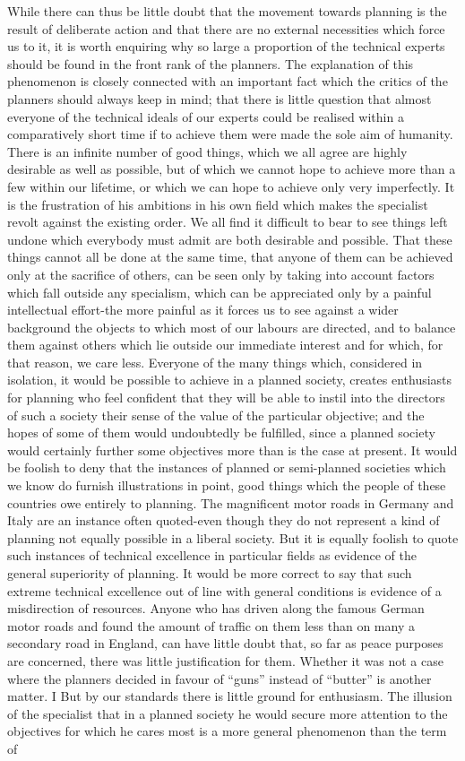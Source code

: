 \documentclass[11pt,openany]{book}
\begin{document}
While there can thus be little doubt that the movement towards planning is the result of deliberate action and that there are no external necessities which force us to it, it is worth enquiring why so large a proportion of the technical experts should be found in the front rank of the planners. The explanation of this phenomenon is closely connected with an important fact which the critics of the planners should always keep in mind; that there is little question that almost everyone of the technical ideals of our experts could be realised within a comparatively short time if to achieve them were made the sole aim of humanity. There is an infinite number of good things, which we all agree are highly desirable as well as possible, but of which we cannot hope to achieve more than a few within our lifetime, or which we can hope to achieve only very imperfectly. It is the frustration of his ambitions in his own field which makes the specialist revolt against the existing order. We all find it difficult to bear to see things left undone which everybody must admit are both desirable and possible. That these things cannot all be done at the same time, that anyone of them can be achieved only at the sacrifice of others, can be seen only by taking into account factors which fall outside any specialism, which can be appreciated only by a painful intellectual effort-the more painful as it forces us to see against a wider background the objects to which most of our labours are directed, and to balance them against others which lie outside our immediate interest and for which, for that reason, we care less. Everyone of the many things which, considered in isolation, it would be possible to achieve in a planned society, creates enthusiasts for planning who feel confident that they will be able to instil into the directors of such a society their sense of the value of the particular objective; and the hopes of some of them would undoubtedly be fulfilled, since a planned society would certainly further some objectives more than is the case at present. It would be foolish to deny that the instances of planned or semi-planned societies which we know do furnish illustrations in point, good things which the people of these countries owe entirely to planning. The magnificent motor roads in Germany and Italy are an instance often quoted-even though they do not represent a kind of planning not equally possible in a liberal society. But it is equally foolish to quote such instances of technical excellence in particular fields as evidence of the general superiority of planning. It would be more correct to say that such extreme technical excellence out of line with general conditions is evidence of a misdirection of resources. Anyone who has driven along the famous German motor roads and found the amount of traffic on them less than on many a secondary road in England, can have little doubt that, so far as peace purposes are concerned, there was little justification for them. Whether it was not a case where the planners decided in favour of ``guns'' instead of ``butter'' is another matter. I But by our standards there is little ground for enthusiasm. The illusion of the specialist that in a planned society he would secure more attention to the objectives for which he cares most is a more general phenomenon than the term of
\end{document}
